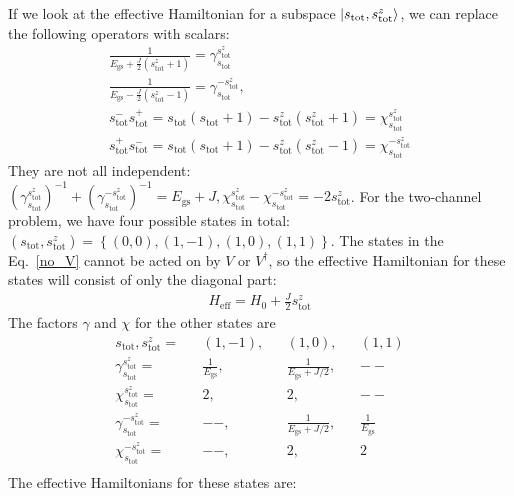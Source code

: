 \documentclass{revtex4-2}
\begin{document}
If we look at the effective Hamiltonian for a subspace \(\ket{s_\text{tot}, s^z_\text{tot}}\), we can replace the following operators with scalars:
\begin{gather}
	\frac{1}{E_\text{gs} + \frac{J}{2} \left(s_\text{tot}^z + 1\right)} = \gamma_{s_\text{tot}}^{s_\text{tot}^z}\\
	\frac{1}{E_\text{gs} - \frac{J}{2} \left(s_\text{tot}^z - 1\right)} = \gamma_{s_\text{tot}}^{-s_\text{tot}^z},\\
	s_\text{tot}^- s_\text{tot}^+ = s_\text{tot}\left(s_\text{tot} + 1\right) - s^z_\text{tot}\left(s^z_\text{tot} + 1\right) = \chi_{s_\text{tot}}^{s_\text{tot}^z}\\
	s_\text{tot}^+ s_\text{tot}^- = s_\text{tot}\left(s_\text{tot} + 1\right) - s^z_\text{tot}\left(s^z_\text{tot} - 1\right) = \chi_{s_\text{tot}}^{-s_\text{tot}^z}
\end{gather}
They are not all independent: \(\left(\gamma_{s_\text{tot}}^{s_\text{tot}^z}\right)^{-1} + \left(\gamma_{s_\text{tot}}^{-s_\text{tot}^z}\right)^{-1} =  E_\text{gs} + J, \chi_{s_\text{tot}}^{s_\text{tot}^z} - \chi_{s_\text{tot}}^{-s_\text{tot}^z} = -2 s^z_\text{tot}\). 
For the two-channel problem, we have four possible states in total: \(\left( s_\text{tot}, s_\text{tot}^z \right) = \left\{ (0,0), (1,-1), (1,0), (1,1) \right\} \). The states in the Eq.~\ref{no_V} cannot be acted on by \(V\) or \(V^\dagger\), so the effective Hamiltonian for these states will consist of only the diagonal part:
\begin{align}
	H_\text{eff} = H_0 + \frac{J}{2}s^z_\text{tot}
\end{align}
The factors \(\gamma\) and \(\chi\) for the other states are
\begin{align}
	s_\text{tot}, s_\text{tot}^z = && (1,-1), && (1,0), && (1,1)\\
	\gamma_{s_\text{tot}}^{s_\text{tot}^z} = && \frac{1}{E_\text{gs}}, && \frac{1}{E_\text{gs} + J/2}, && -- \\
	\chi_{s_\text{tot}}^{s_\text{tot}^z} = && 2, && 2, && --\\
	\gamma_{s_\text{tot}}^{-s_\text{tot}^z} = && --, && \frac{1}{E_\text{gs} + J/2}, && \frac{1}{E_\text{gs}}\\
	\chi_{s_\text{tot}}^{-s_\text{tot}^z} = && --, && 2, && 2\\
\end{align}
The effective Hamiltonians for these states are:
\end{document}
